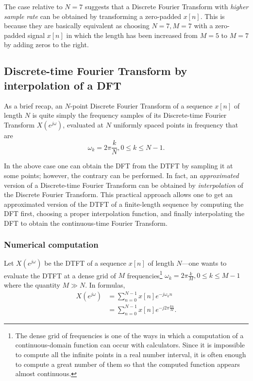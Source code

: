 \documentclass[\documentfontsize, twocolumn]{\classname}
\begin{document}
The case relative to $N=7$ suggests that a Discrete Fourier Transform with \emph{higher sample rate} can be obtained by transforming a zero-padded $x[n]$. This is because they are basically equivalent as choosing $N=7, M=7$ with a zero-padded signal $x[n]$ in which the length has been increased from $M=5$ to $M=7$ by adding zeros to the right.


\subsection{Discrete-time Fourier Transform by interpolation of a DFT}

As a brief recap, an $N$-point Discrete Fourier Transform of a sequence $x[n]$ of length $N$ is quite simply the frequency samples of its Discrete-time Fourier Transform $X(e^{j\omega})$, evaluated at $N$ uniformly spaced points in frequency that are
\[
    \omega_k = 2\pi \frac k N, 0 \leq k \leq N-1.
\]

In the above case one can obtain the DFT from the DTFT by sampling it at some points; however, the contrary can be performed. In fact, an \emph{approximated} version of a Discrete-time Fourier Transform can be obtained by \emph{interpolation} of the Discrete Fourier Transform. This practical approach allows one to get an approximated version of the DTFT of a finite-length sequence by computing the DFT first, choosing a proper interpolation function, and finally interpolating the DFT to obtain the continuous-time Fourier Transform.

\subsubsection{Numerical computation}

Let $X(e^{j\omega})$ be the DTFT of a sequence $x[n]$ of length $N$---one wants to evaluate the DTFT at a dense grid of $M$ frequencies\footnote{
The dense grid of frequencies is one of the ways in which a computation of a continuous-domain function can occur with calculators. Since it is impossible to compute all the infinite points in a real number interval, it is often enough to compute a great number of them so that the computed function appears almost continuous.
} $\omega_k = 2\pi \frac k M, 0 \leq k \leq M-1$ where the quantity $M \gg N$. In formulas,
\begin{align*}
    X(e^{j\omega}) 
    &= \sum_{n=0}^{N-1} x[n] e^{-j\omega_k n}\\
    &= \sum_{n=0}^{N-1} x[n] e^{-j2\pi \frac{kn}{M}}.
\end{align*}
\end{document}
